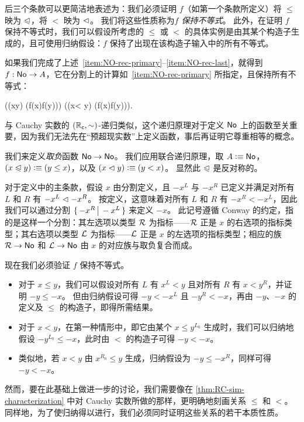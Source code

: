 后三个条款可以更简洁地表述为：我们必须证明 $f$（如第一个条款所定义）将 $\le$ 映为 $\trianglelefteqslant$，将 $<$ 映为 $\vartriangleleft$。
我们将这些性质称为\emph{$f$ 保持不等式}。
此外，在证明 $f$ 保持不等式时，我们可以假设所考虑的 $\le$ 或 $<$ 的具体实例是由其某个构造子生成的，且可使用归纳假设：$f$ 保持了出现在该构造子输入中的所有不等式。

如果我们完成了上述~\ref{item:NO-rec-primary}--\ref{item:NO-rec-last}，就得到 $f:\mathsf{No}\to A$，它在分割上的计算如~\ref{item:NO-rec-primary} 所指定，且保持所有不等式：
%
\begin{narrowmultline*}
  \Big((x\le y) \to (f(x)\ble f(y))\Big) \land
  \narrowbreak
  \Big((x< y) \to (f(x)\blt f(y))\Big).
\end{narrowmultline*}
%
与 Cauchy 实数的 $(\mathbb{R}_\mathsf{c},\mathord\sim)$-递归类似，这个递归原理对于定义 $\mathsf{No}$ 上的函数至关重要，因为我们无法先在``预超现实数''上定义函数，事后再证明它尊重相等的概念。

\begin{eg}
  我们来定义\emph{取负}函数 $\mathsf{No}\to\mathsf{No}$。
  我们应用联合递归原理，取 $A\vcentcolon\equiv\mathsf{No}$，$(x\trianglelefteqslant y)\vcentcolon\equiv (y\le x)$，以及 $(x\vartriangleleft y)\vcentcolon\equiv (y< x)$。
  显然此 $\trianglelefteqslant$ 是反对称的。

  对于定义中的主条款，假设 $x$ 由分割定义，且 $-x^L$ 与 $-x^R$ 已定义并满足对所有 $L$ 和 $R$ 有 $-x^L \vartriangleleft -x^R$。
  按定义，这意味着对所有 $L$ 和 $R$ 有 $-x^R < -x^L$，因此我们可以通过分割 $\{\,-x^R\,\big|\,-x^L\,\}$ 来定义 $-x$。
  此记号遵循 Conway 的约定，指的是这样一个分割：其左选项以类型 $\mathcal{R}$ 为指标——$\mathcal{R}$ 正是 $x$ 的右选项的指标类型；其右选项以类型 $\mathcal{L}$ 为指标——$\mathcal{L}$ 正是 $x$ 的左选项的指标类型；相应的族 $\mathcal{R}\to\mathsf{No}$ 和 $\mathcal{L}\to\mathsf{No}$ 由 $x$ 的对应族与取负复合而成。

  现在我们必须验证 $f$ 保持不等式。
  \begin{itemize}
  \item 对于 $x\le y$，我们可以假设对所有 $L$ 有 $x^L<y$ 且对所有 $R$ 有 $x < y^R$，并证明 $-y\le -x$。
    但由归纳假设可得 $-y < -x^L$ 且 $-y^R < -x$，再由 $-y$、$-x$ 的定义及 $\le$ 的构造子，即得所需结果。
  \item 对于 $x<y$，在第一种情形中，即它由某个 $x\le y^{L_0}$ 生成时，我们可以归纳地假设 $-y^{L_0} \le -x$，此时由 $<$ 的构造子可得 $-y<-x$。
  \item 类似地，若 $x<y$ 由 $x^{R_0}\le y$ 生成，归纳假设为 $-y \le -x^R$，同样可得 $-y<-x$。
  \end{itemize}
\end{eg}

然而，要在此基础上做进一步的讨论，我们需要像在 \cref{thm:RC-sim-characterization} 中对 Cauchy 实数所做的那样，更明确地刻画关系 $\le$ 和 $<$。
同样地，为了使归纳得以进行，我们必须同时证明这些关系的若干本质性质。


